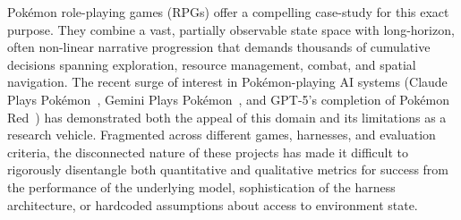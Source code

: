 Pok\'{e}mon role-playing games (RPGs) offer a compelling case-study for this exact purpose. They combine a vast, partially observable state space with long-horizon, often non-linear narrative progression that demands thousands of cumulative decisions spanning exploration, resource management, combat, and spatial navigation. The recent surge of interest in Pok\'{e}mon-playing AI systems (Claude Plays Pok\'{e}mon~\citep{anthropic2025visible}, Gemini Plays Pok\'{e}mon~\citep{zhang2025geminiplayspokemon}, and GPT-5's completion of Pok\'{e}mon Red~\citep{engadget2025gptplayspokemon}) has demonstrated both the appeal of this domain and its limitations as a research vehicle. Fragmented across different games, harnesses, and evaluation criteria, the disconnected nature of these projects has made it difficult to rigorously disentangle both quantitative and qualitative metrics for success from the performance of the underlying model, sophistication of the harness architecture, or hardcoded assumptions about access to environment state.

